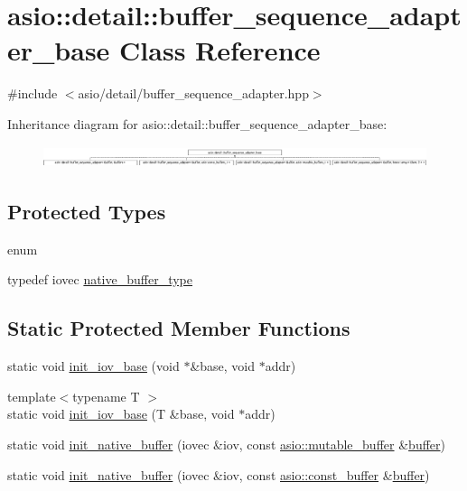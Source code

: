\hypertarget{classasio_1_1detail_1_1buffer__sequence__adapter__base}{}\section{asio\+:\+:detail\+:\+:buffer\+\_\+sequence\+\_\+adapter\+\_\+base Class Reference}
\label{classasio_1_1detail_1_1buffer__sequence__adapter__base}


{\ttfamily \#include $<$asio/detail/buffer\+\_\+sequence\+\_\+adapter.\+hpp$>$}

Inheritance diagram for asio\+:\+:detail\+:\+:buffer\+\_\+sequence\+\_\+adapter\+\_\+base\+:\begin{figure}[H]
\begin{center}
\leavevmode
\includegraphics[height=0.648148cm]{classasio_1_1detail_1_1buffer__sequence__adapter__base}
\end{center}
\end{figure}
\subsection*{Protected Types}
\begin{DoxyCompactItemize}
\item 
enum 
\item 
typedef iovec \hyperlink{classasio_1_1detail_1_1buffer__sequence__adapter__base_a91d037bd052777b8df514e6b94ec9e71}{native\+\_\+buffer\+\_\+type}
\end{DoxyCompactItemize}
\subsection*{Static Protected Member Functions}
\begin{DoxyCompactItemize}
\item 
static void \hyperlink{classasio_1_1detail_1_1buffer__sequence__adapter__base_a7fb7b0ec258640205812c8e63fe4b334}{init\+\_\+iov\+\_\+base} (void $\ast$\&base, void $\ast$addr)
\item 
{\footnotesize template$<$typename T $>$ }\\static void \hyperlink{classasio_1_1detail_1_1buffer__sequence__adapter__base_a1791d2dfb509ba5c3202625e4462aa81}{init\+\_\+iov\+\_\+base} (T \&base, void $\ast$addr)
\item 
static void \hyperlink{classasio_1_1detail_1_1buffer__sequence__adapter__base_aacb19d9f1ddf93bfc18f64352b67726d}{init\+\_\+native\+\_\+buffer} (iovec \&iov, const \hyperlink{classasio_1_1mutable__buffer}{asio\+::mutable\+\_\+buffer} \&\hyperlink{group__buffer_ga1ed66e401559cbfd19595392f653b47c}{buffer})
\item 
static void \hyperlink{classasio_1_1detail_1_1buffer__sequence__adapter__base_a5122ae3238570a50367716e41d572787}{init\+\_\+native\+\_\+buffer} (iovec \&iov, const \hyperlink{classasio_1_1const__buffer}{asio\+::const\+\_\+buffer} \&\hyperlink{group__buffer_ga1ed66e401559cbfd19595392f653b47c}{buffer})
\end{DoxyCompactItemize}


